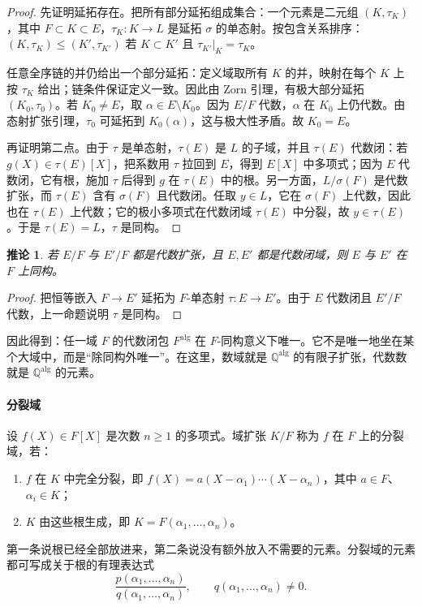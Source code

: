\documentclass[11pt,a4paper,openany]{ctexbook}
\numberwithin{equation}{chapter}
\newcommand{\Q}{\mathbb{Q}}
\theoremstyle{plain}
\newtheorem{corollary}[theorem]{推论}
\theoremstyle{definition}
\theoremstyle{remark}
\begin{document}
\begin{proof}
先证明延拓存在。把所有部分延拓组成集合：一个元素是二元组 $(K,\tau_K)$，其中 $F\subset K\subset E$，$\tau_K:K\to L$ 是延拓 $\sigma$ 的单态射。按包含关系排序：$(K,\tau_K)\le (K',\tau_{K'})$ 若 $K\subset K'$ 且 $\tau_{K'}|_K=\tau_K$。

任意全序链的并仍给出一个部分延拓：定义域取所有 $K$ 的并，映射在每个 $K$ 上按 $\tau_K$ 给出；链条件保证定义一致。因此由 Zorn 引理，有极大部分延拓 $(K_0,\tau_0)$。若 $K_0\ne E$，取 $\alpha\in E\setminus K_0$。因为 $E/F$ 代数，$\alpha$ 在 $K_0$ 上仍代数。由态射扩张引理，$\tau_0$ 可延拓到 $K_0(\alpha)$，这与极大性矛盾。故 $K_0=E$。

再证明第二点。由于 $\tau$ 是单态射，$\tau(E)$ 是 $L$ 的子域，并且 $\tau(E)$ 代数闭：若 $g(X)\in \tau(E)[X]$，把系数用 $\tau$ 拉回到 $E$，得到 $E[X]$ 中多项式；因为 $E$ 代数闭，它有根，施加 $\tau$ 后得到 $g$ 在 $\tau(E)$ 中的根。另一方面，$L/\sigma(F)$ 是代数扩张，而 $\tau(E)$ 含有 $\sigma(F)$ 且代数闭。任取 $y\in L$，它在 $\sigma(F)$ 上代数，因此也在 $\tau(E)$ 上代数；它的极小多项式在代数闭域 $\tau(E)$ 中分裂，故 $y\in\tau(E)$。于是 $\tau(E)=L$，$\tau$ 是同构。
\end{proof}

\begin{corollary}
若 $E/F$ 与 $E'/F$ 都是代数扩张，且 $E,E'$ 都是代数闭域，则 $E$ 与 $E'$ 在 $F$ 上同构。
\end{corollary}

\begin{proof}
把恒等嵌入 $F\to E'$ 延拓为 $F$-单态射 $\tau:E\to E'$。由于 $E$ 代数闭且 $E'/F$ 代数，上一命题说明 $\tau$ 是同构。
\end{proof}

因此得到：任一域 $F$ 的代数闭包 $F^{\mathrm{alg}}$ 在 $F$-同构意义下唯一。它不是唯一地坐在某个大域中，而是“除同构外唯一”。在这里，数域就是 $\Q^{\mathrm{alg}}$ 的有限子扩张，代数数就是 $\Q^{\mathrm{alg}}$ 的元素。

\paragraph{分裂域}
设 $f(X)\in F[X]$ 是次数 $n\ge1$ 的多项式。域扩张 $K/F$ 称为 $f$ 在 $F$ 上的分裂域，若：
\begin{enumerate}[label=(\arabic*)]
\item $f$ 在 $K$ 中完全分裂，即 $f(X)=a(X-\alpha_1)\cdots(X-\alpha_n)$，其中 $a\in F$、$\alpha_i\in K$；
\item $K$ 由这些根生成，即 $K=F(\alpha_1,\dots,\alpha_n)$。
\end{enumerate}
第一条说根已经全部放进来，第二条说没有额外放入不需要的元素。分裂域的元素都可写成关于根的有理表达式
\[
\frac{p(\alpha_1,\dots,\alpha_n)}{q(\alpha_1,\dots,\alpha_n)},\qquad q(\alpha_1,\dots,\alpha_n)\ne0.
\]
\end{document}
